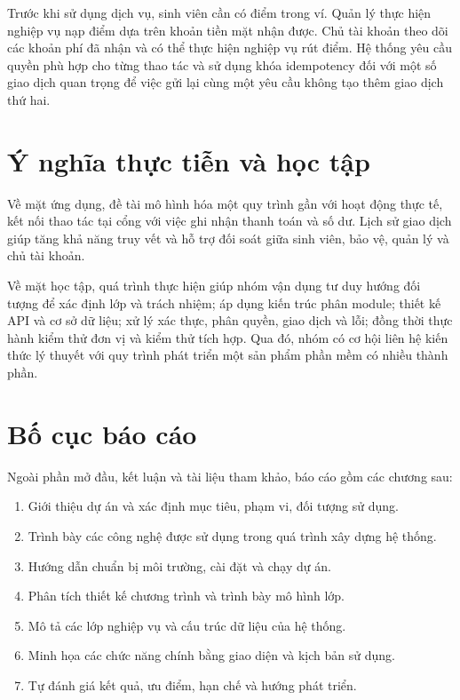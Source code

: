 Trước khi sử dụng dịch vụ, sinh viên cần có điểm trong ví. Quản lý thực hiện nghiệp vụ nạp điểm dựa trên khoản tiền mặt nhận được. Chủ tài khoản theo dõi các khoản phí đã nhận và có thể thực hiện nghiệp vụ rút điểm. Hệ thống yêu cầu quyền phù hợp cho từng thao tác và sử dụng khóa idempotency đối với một số giao dịch quan trọng để việc gửi lại cùng một yêu cầu không tạo thêm giao dịch thứ hai.

\section{Ý nghĩa thực tiễn và học tập}

Về mặt ứng dụng, đề tài mô hình hóa một quy trình gần với hoạt động thực tế, kết nối thao tác tại cổng với việc ghi nhận thanh toán và số dư. Lịch sử giao dịch giúp tăng khả năng truy vết và hỗ trợ đối soát giữa sinh viên, bảo vệ, quản lý và chủ tài khoản.

Về mặt học tập, quá trình thực hiện giúp nhóm vận dụng tư duy hướng đối tượng để xác định lớp và trách nhiệm; áp dụng kiến trúc phân module; thiết kế API và cơ sở dữ liệu; xử lý xác thực, phân quyền, giao dịch và lỗi; đồng thời thực hành kiểm thử đơn vị và kiểm thử tích hợp. Qua đó, nhóm có cơ hội liên hệ kiến thức lý thuyết với quy trình phát triển một sản phẩm phần mềm có nhiều thành phần.

\section{Bố cục báo cáo}

Ngoài phần mở đầu, kết luận và tài liệu tham khảo, báo cáo gồm các chương sau:
\begin{enumerate}[label=\textbf{Chương \arabic*:},leftmargin=3cm]
    \item Giới thiệu dự án và xác định mục tiêu, phạm vi, đối tượng sử dụng.
    \item Trình bày các công nghệ được sử dụng trong quá trình xây dựng hệ thống.
    \item Hướng dẫn chuẩn bị môi trường, cài đặt và chạy dự án.
    \item Phân tích thiết kế chương trình và trình bày mô hình lớp.
    \item Mô tả các lớp nghiệp vụ và cấu trúc dữ liệu của hệ thống.
    \item Minh họa các chức năng chính bằng giao diện và kịch bản sử dụng.
    \item Tự đánh giá kết quả, ưu điểm, hạn chế và hướng phát triển.
\end{enumerate}
